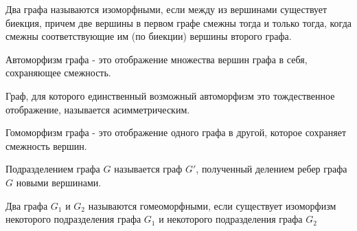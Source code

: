 
\begin{definition}
  Два графа называются изоморфными, если между из вершинами существует биекция,
  причем две вершины в первом графе смежны тогда и только тогда, когда смежны
  соответствующие им (по биекции) вершины второго графа.
\end{definition}

\begin{definition}
  Автоморфизм графа - это отображение множества вершин графа в себя, сохраняющее
  смежность.
\end{definition}

\begin{remark}
  Граф, для которого единственный возможный автоморфизм это тождественное
  отображение, называется асимметрическим.
\end{remark}

\begin{definition}
  Гомоморфизм графа - это отображение одного графа в другой, которое сохраняет
  смежность вершин.
\end{definition}

\begin{definition}
  Подразделением графа \(G\) называется граф \(G'\), полученный делением ребер
  графа \(G\) новыми вершинами.
\end{definition}

\begin{definition}
  Два графа \(G_{1}\) и \(G_{2}\) называются гомеоморфными, если существует
  изоморфизм некоторого подразделения графа \(G_{1}\) и некоторого подразделения
  графа \(G_{2}\)
\end{definition}
